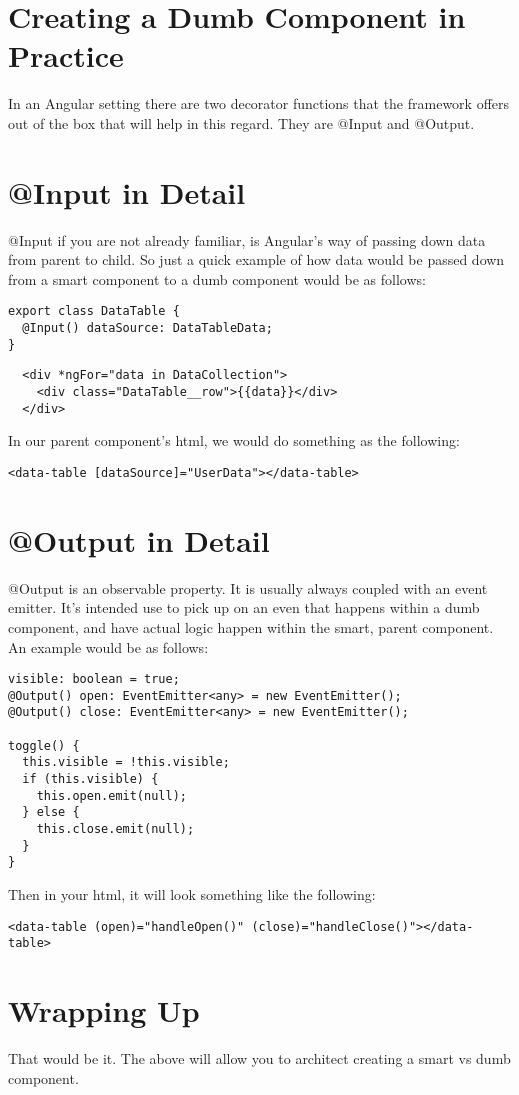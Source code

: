 \section{Creating a Dumb Component in Practice}
In an Angular setting there are two decorator functions that the framework
offers out of the box that will help in this regard. They are @Input and
@Output.

\section{@Input in Detail}
@Input if you are not already familiar, is Angular's way of passing down data
from parent to child. So just a quick example of how data would be passed down
from a smart component to a dumb component would be as follows:
\begin{lstlisting}
export class DataTable {
  @Input() dataSource: DataTableData;
}
\end{lstlisting}
\begin{verbatim}
  <div *ngFor="data in DataCollection">
    <div class="DataTable__row">{{data}}</div>
  </div>
\end{verbatim}

In our parent component's html, we would do something as the following:
\begin{lstlisting}
<data-table [dataSource]="UserData"></data-table>
\end{lstlisting}


\section{@Output in Detail}
@Output is an observable property. It is usually always coupled with an
event emitter. It's intended use to pick up on an even that happens within a
dumb component, and have actual logic happen within the smart, parent component.
An example would be as follows:
\begin{lstlisting}
visible: boolean = true;
@Output() open: EventEmitter<any> = new EventEmitter();
@Output() close: EventEmitter<any> = new EventEmitter();

toggle() {
  this.visible = !this.visible;
  if (this.visible) {
    this.open.emit(null);
  } else {
    this.close.emit(null);
  }
}
\end{lstlisting}
Then in your html, it will look something like the following:
\begin{lstlisting}
<data-table (open)="handleOpen()" (close)="handleClose()"></data-table>
\end{lstlisting}

\section{Wrapping Up}
That would be it. The above will allow you to architect creating a smart vs
dumb component.
